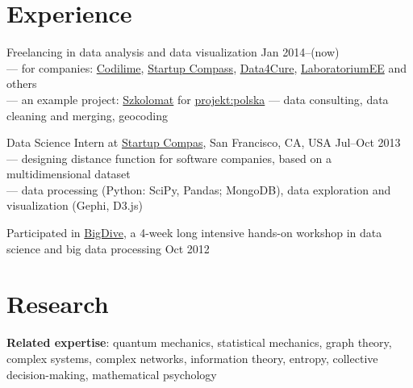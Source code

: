 \documentclass[margin,line]{resume}
\begin{document}
\begin{resume}

    \section{\mysidestyle Experience}

    \begin{list2}

    \item Freelancing in data analysis and data visualization  \hfill Jan 2014--(now)\\
        --- for companies: \href{http://www.codilime.com/}{Codilime}, \href{http://compass.co}{Startup Compass}, \href{http://www.data4cure.com/}{Data4Cure}, \href{https://laboratorium.ee/en}{LaboratoriumEE} and others\\
        --- an example project: \href{http://szkolomat.pl/}{Szkolomat} for \href{http://projektpolska.pl/english/}{projekt:polska} --- data consulting, data cleaning and merging, geocoding\\

    \item Data Science Intern at \href{http://compass.co}{Startup Compas}, San Francisco, CA, USA \hfill Jul--Oct 2013\\
        --- designing distance function for software companies, based on a multidimensional dataset\\
        --- data processing (Python: SciPy, Pandas; MongoDB), data exploration and visualization (Gephi, D3.js)

    \item Participated in \href{http://bigdive.eu}{BigDive}, a 4-week long intensive hands-on workshop in data science and big data processing \hfill { Oct 2012}

    \end{list2}

    \section{\mysidestyle Research}

    \begin{list2}

    \item {\bf Related expertise}: quantum mechanics, statistical mechanics, graph theory, complex systems, complex networks, information theory, entropy, collective decision-making, mathematical psychology


\end{list2}
\end{resume}
\end{document}
